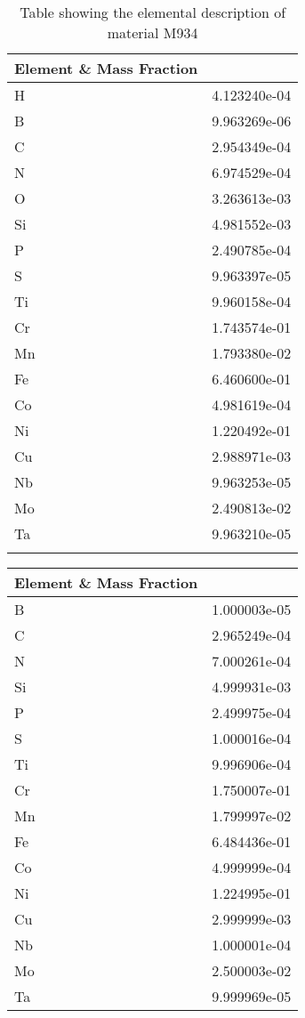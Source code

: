 \begin{centering}
\clearpage
\begin{longtable}[ht!]
{ p{} | p{} }
\hline
Element \& Mass Fraction\\
\hline
H &  4.123240e-04\\
B &  9.963269e-06\\
C &  2.954349e-04\\
N &  6.974529e-04\\
O &  3.263613e-03\\
Si &  4.981552e-03\\
P &  2.490785e-04\\
S &  9.963397e-05\\
Ti &  9.960158e-04\\
Cr &  1.743574e-01\\
Mn &  1.793380e-02\\
Fe &  6.460600e-01\\
Co &  4.981619e-04\\
Ni &  1.220492e-01\\
Cu &  2.988971e-03\\
Nb &  9.963253e-05\\
Mo &  2.490813e-02\\
Ta &  9.963210e-05\\
\caption{Table showing the elemental description of material M934}
\label{table:material_UPDSM}
\end{longtable}
\clearpage
\begin{longtable}[ht!]
{ p{} | p{} }
\hline
Element \& Mass Fraction\\
\hline
B &  1.000003e-05\\
C &  2.965249e-04\\
N &  7.000261e-04\\
Si &  4.999931e-03\\
P &  2.499975e-04\\
S &  1.000016e-04\\
Ti &  9.996906e-04\\
Cr &  1.750007e-01\\
Mn &  1.799997e-02\\
Fe &  6.484436e-01\\
Co &  4.999999e-04\\
Ni &  1.224995e-01\\
Cu &  2.999999e-03\\
Nb &  1.000001e-04\\
Mo &  2.500003e-02\\
Ta &  9.999969e-05\\

\end{longtable}
\end{centering}
